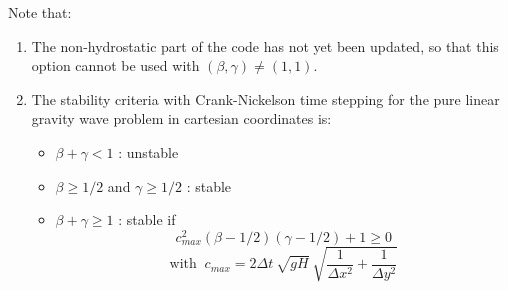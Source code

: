 Note that:
\begin{enumerate}
\item The non-hydrostatic part of the code has not yet been 
updated, so that this option cannot be used with $(\beta,\gamma) \neq (1,1)$.
\item The stability criteria with Crank-Nickelson time stepping
for the pure linear gravity wave problem in cartesian coordinates is:
\begin{itemize}
\item $\beta + \gamma < 1$ : unstable
\item $\beta \geq 1/2$ and $ \gamma \geq 1/2$ : stable
\item $\beta + \gamma \geq 1$ : stable if
$$ 
c_{max}^2 (\beta - 1/2)(\gamma - 1/2) + 1 \geq 0
$$
$$
\mbox{with }~
c_{max} =  2 \Delta t \: \sqrt{g H} \: 
\sqrt{ \frac{1}{\Delta x^2} + \frac{1}{\Delta y^2} }
$$
\end{itemize}
\end{enumerate}


